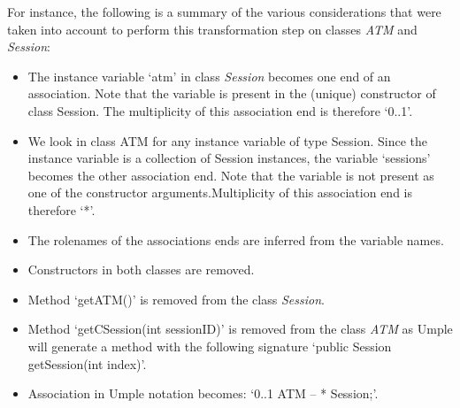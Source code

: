 For instance, the following is a summary of the various considerations that were taken into account to perform this transformation step on classes \textit{ATM} and \textit{Session}:

\begin{itemize}
\item The instance variable `atm' in class \textit{Session} becomes one end of an association. 
Note that the variable is present in the (unique) constructor of class Session. The multiplicity of this association end is therefore `0..1'.

\item We look in class ATM for any instance variable of type Session. Since the instance variable is a collection of Session instances, the variable `sessions' becomes the other association end. Note that the variable is not present as one of the constructor arguments.Multiplicity of this association end is therefore `*'.

\item The rolenames of the associations ends are inferred from the variable names.

\item Constructors in both classes are removed.

\item Method `getATM()' is removed from the class \textit{Session}.

\item Method `getCSession(int sessionID)' is removed from the class \textit{ATM} as Umple will generate a method with the following signature `public Session getSession(int index)'.

\item Association in Umple notation becomes:  `0..1 ATM --  * Session;'.
\end{itemize}

